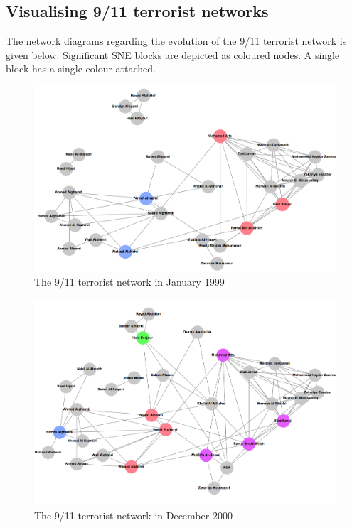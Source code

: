 \begin{subappendices}

\section{Visualising 9/11 terrorist networks}

The network diagrams regarding the evolution of the 9/11 terrorist network is given below. Significant SNE blocks are depicted as coloured nodes. A single block has a single colour attached.

\begin{figure}[h]
\begin{center}
\includegraphics[scale=0.4]{Images/T1999-01.png}
\end{center}
\caption{The 9/11 terrorist network in January 1999}
\label{Terrorist-Jan99}
\end{figure}

\begin{figure}[h]
\begin{center}
\includegraphics[scale=0.4]{Images/T2000-12.png}
\end{center}
\caption{The 9/11 terrorist network in December 2000}
\label{Terrorist-Dec00}
\end{figure}


\end{subappendices}
